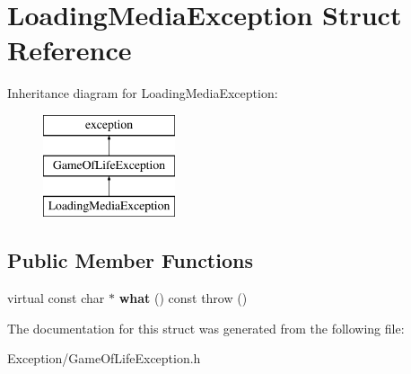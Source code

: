 \hypertarget{struct_loading_media_exception}{}\section{Loading\+Media\+Exception Struct Reference}
\label{struct_loading_media_exception}
Inheritance diagram for Loading\+Media\+Exception\+:\begin{figure}[H]
\begin{center}
\leavevmode
\includegraphics[height=3.000000cm]{struct_loading_media_exception}
\end{center}
\end{figure}
\subsection*{Public Member Functions}
\begin{DoxyCompactItemize}
\item 
\hypertarget{struct_loading_media_exception_ad1655861e1b84b5397b9bf3519026fac}{}virtual const char $\ast$ {\bfseries what} () const   throw ()\label{struct_loading_media_exception_ad1655861e1b84b5397b9bf3519026fac}

\end{DoxyCompactItemize}


The documentation for this struct was generated from the following file\+:\begin{DoxyCompactItemize}
\item 
Exception/Game\+Of\+Life\+Exception.\+h\end{DoxyCompactItemize}
